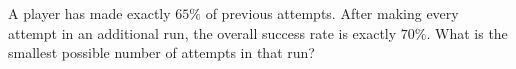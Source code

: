 A player has made exactly $65\%$ of previous attempts. After making every attempt in an additional run, the overall success rate is exactly $70\%$. What is the smallest possible number of attempts in that run?
